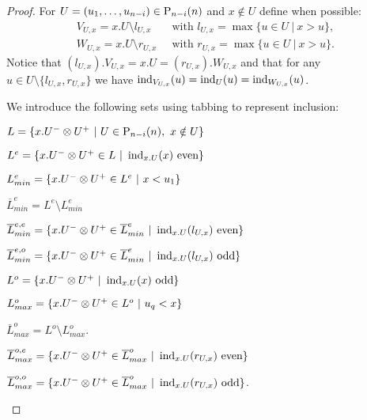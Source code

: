 \begin{proof}
	For $U = (u_1, \dots, u_{n-i}) \in \P_{n-i}(n)$ and $x \notin U$ define when possible:
	\begin{align*}
	V_{U,x} = x.U \setminus l_{U, x} & \ \text{ with } l_{U,x} = \max\{u\in U\ |\ x>u\}, \\
	W_{U,x} = x.U \setminus r_{U, x} & \ \text{ with } r_{U,x} = \max\{u \in U\ |\ x>u\}.
	\end{align*}
	Notice that $(l_{U,x}).V_{U,x} = x.U = (r_{U,x}).W_{U,x}$ and that for any $u \in U \setminus \{l_{U,x}, r_{U,x}\}$ we have $\ind_{V_{U,x}}(u) = \ind_{U}(u) = \ind_{W_{U,x}}(u)$.

	We introduce the following sets using tabbing to represent inclusion:

	\vspace*{5pt}
	$L = \{x.U^- \tensor U^+\ | \ U \in \P_{n-i}(n),\ x \notin U\}$
	\vspace*{1pt}
	\begin{tab}
		$L^{e} = \{x.U^- \tensor U^+ \in L\ | \ \ind_{x.U}(x) \text{ even}\}$
		\begin{tab}
			$L_{min}^{e} = \{x.U^- \tensor U^+ \in L^e\ | \ x < u_1 \}$ \par
			$\overline{L}_{min}^{e} = L^{e} \setminus L_{min}^{e}$
			\begin{tab}
				$\overline{L}_{min}^{e,e} = \{ x.U^- \tensor U^+ \in \overline{L}_{min}^{e}\ | \ \ind_{x.U}(l_{U,x}) \text{ even} \}$ \par
				$\overline{L}_{min}^{e,o} = \{ x.U^- \tensor U^+ \in \overline{L}_{min}^{e}\ | \ \ind_{x.U}(l_{U,x}) \text{ odd} \}$
				\vspace*{7pt}
			\end{tab}
		\end{tab}
		$L^{o} = \{x.U^- \tensor U^+\ | \ \ind_{x.U}(x) \text{ odd}\}$ \par
		\begin{tab}
			$L_{max}^{o} = \{x.U^- \tensor U^+ \in L^o\ | \ u_q < x \}$ \par
			$\overline{L}_{max}^{o} = L^{o}\setminus L_{max}^{o}$.
			\begin{tab}
				$\overline{L}_{max}^{o,e} = \{ x.U^- \tensor U^+ \in \overline{L}_{max}^{o}\ | \ \ind_{x.U}(r_{U,x}) \text{ even} \}$ \par
				$\overline{L}_{max}^{o,o} = \{ x.U^- \tensor U^+ \in \overline{L}_{max}^{o}\ | \ \ind_{x.U}(r_{U,x}) \text{ odd} \}$.
			\end{tab}
		\end{tab}
	\end{tab}


\end{proof}
